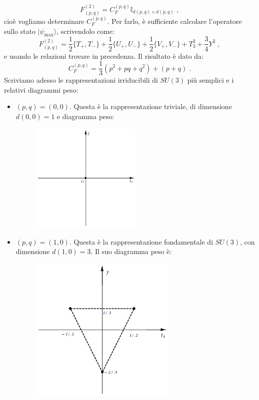 \documentclass[12pt,a4paper]{article}
\theoremstyle{definition}
\newcommand{\ket}{\rangle}
\numberwithin{equation}{section}
\begin{document}
$$
F^{(2)}_{(p,q)}=C_F^{(p,q)}\mathbb{I}_{d(p,q)\times d(p,q)}\;,
$$
cioè vogliamo determinare $C_F^{(p,q)}$. Per farlo, è sufficiente calcolare l'operatore sullo stato $|\psi_{\mathrm{max}}\ket$, scrivendolo come:
\begin{equation}
F^{(2)}_{(p,q)}=\frac{1}{2}\{T_+,T_-\}+\frac{1}{2}\{U_+,U_-\}+\frac{1}{2}\{V_+,V_-\}+T_3^2+\frac{3}{4}Y^2\;,
\end{equation}
e usando le relazioni trovare in precedenza. Il risultato è dato da:
\begin{equation}
C_F^{(p,q)}=\frac{1}{3}(p^2+pq+q^2)+(p+q)\;.
\end{equation}
Scriviamo adesso le rappresentazioni irriducibili di $SU(3)$ più semplici e i relativi diagrammi peso:
\begin{itemize}
\item $(p,q)=(0,0)$. Questa è la rappresentazione triviale, di dimensione $d(0,0)=1$ e diagramma peso:
\begin{figure}[h]
\centering
\includegraphics[width=150pt,keepaspectratio=true]{Addons/00}
\end{figure}
\pagebreak
\item $(p,q)=(1,0)$. Questa è la rappresentazione fondamentale di $SU(3)$, con dimensione $d(1,0)=3$. Il suo diagramma peso è:
\begin{figure}[h]
\centering
\includegraphics[width=200pt,keepaspectratio=true]{Addons/10}
\end{figure}


\end{itemize}
\end{document}

